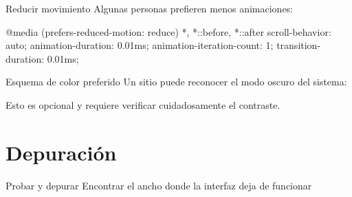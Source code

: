 \documentclass[aspectratio=169,11pt]{beamer}
\begin{document}
    \begin{frame}[fragile]{Reducir movimiento}
        Algunas personas prefieren menos animaciones:

        \begin{csscodedark}
            @media (prefers-reduced-motion: reduce) {
                *,
                *::before,
                *::after {
                    scroll-behavior: auto;
                    animation-duration: 0.01ms;
                    animation-iteration-count: 1;
                    transition-duration: 0.01ms;
                }
            }
        \end{csscodedark}

    \end{frame}

    \begin{frame}[fragile]{Esquema de color preferido}
        Un sitio puede reconocer el modo oscuro del sistema:


        Esto es opcional y requiere verificar cuidadosamente el contraste.
    \end{frame}

    \section{Depuración}

    \SectionSlide
    {Probar y depurar}
    {Encontrar el ancho donde la interfaz deja de funcionar}
\end{document}
